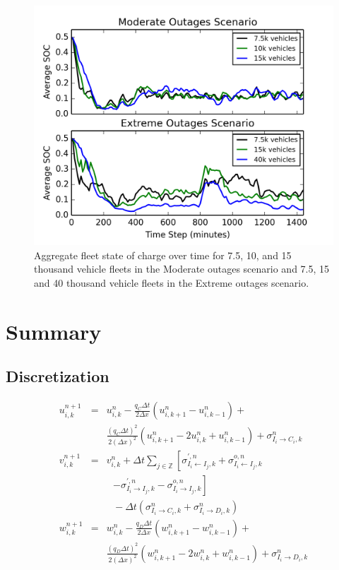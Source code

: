 \documentclass[journal]{IEEEtran}
\begin{document}
\begin{figure}[!htbp]
  \includegraphics[width=\linewidth]{plots/soc_v_time.png}
  \caption{Aggregate fleet state of charge over time for 7.5, 10, and 15 thousand vehicle fleets in the Moderate outages scenario and 7.5, 15 and 40 thousand vehicle fleets in the Extreme outages scenario.}
  \label{fig:soe}
\end{figure}

\section{Summary}




\subsection{Discretization}

\begin{eqnarray*}
    u_{i,k}^{n+1} &=& u_{i,k}^{n} - \frac{q_C \Delta t}{2 \Delta x}\left(u_{i,k+1}^{n} - u_{i,k-1}^{n} \right) + \\
    && \frac{(q_C \Delta t)^2}{2 (\Delta x)^2}\left(u_{i,k+1}^{n} - 2u_{i,k}^{n} + u_{i,k-1}^{n} \right) + \sigma_{I_i \rightarrow C_i,k}^n \\
    v_{i,k}^{n+1} &=& v_{i,k}^{n} + \Delta t \sum_{j\in\mathbb{Z}} \left[ \sigma_{I_i \leftarrow I_j,k}^{\prime,n} + \sigma_{I_i \leftarrow I_j,k}^{o,n} \right. \\
    & & ~~~ \left. - \sigma_{I_i \rightarrow I_j,k}^{\prime,n} - \sigma_{I_i \rightarrow I_j,k}^{o,n} \right] \\
    && ~~~ - \Delta t \left( \sigma_{I_i \rightarrow C_i,k}^n + \sigma_{I_i \rightarrow D_i,k}^n \right) \\
    w_{i,k}^{n+1} &=& w_{i,k}^{n} - \frac{q_D \Delta t}{2 \Delta x}\left(w_{i,k+1}^{n} - w_{i,k-1}^{n} \right) + \\
    && \frac{(q_D \Delta t)^2}{2 (\Delta x)^2}\left(w_{i,k+1}^{n} - 2w_{i,k}^{n} + w_{i,k-1}^{n} \right) + \sigma_{I_i \rightarrow D_i,k}^n \\   
\end{eqnarray*}
\end{document}

